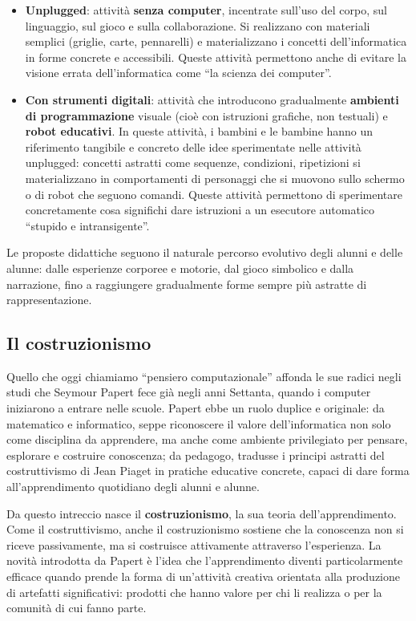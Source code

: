 \begin{itemize}
\item
  \textbf{Unplugged}: attività \textbf{senza computer}, incentrate sull'uso del corpo, sul linguaggio, sul gioco e sulla collaborazione. Si realizzano con materiali semplici (griglie, carte, pennarelli) e materializzano i concetti dell'informatica in forme concrete e accessibili. Queste attività permettono anche di evitare la visione errata dell'informatica come ``la scienza dei computer''.
\item
  \textbf{Con strumenti digitali}: attività che introducono gradualmente \textbf{ambienti di programmazione} visuale (cioè con istruzioni grafiche, non testuali) e \textbf{robot educativi}. In queste attività, i bambini e le bambine hanno un riferimento tangibile e concreto delle idee sperimentate nelle attività unplugged: concetti astratti come sequenze, condizioni, ripetizioni si materializzano in comportamenti di personaggi che si muovono sullo schermo o di robot che seguono comandi. Queste attività permettono di sperimentare concretamente cosa significhi dare istruzioni a un esecutore automatico ``stupido e intransigente''.
\end{itemize}

Le proposte didattiche seguono il naturale percorso evolutivo degli alunni e delle alunne: dalle esperienze corporee e motorie, dal gioco simbolico e dalla narrazione, fino a raggiungere gradualmente forme sempre più astratte di rappresentazione.

\subsection{Il costruzionismo }\label{il-costruzionismo}

Quello che oggi chiamiamo ``pensiero computazionale'' affonda le sue radici negli studi che Seymour Papert fece già negli anni Settanta, quando i computer iniziarono a entrare nelle scuole. Papert ebbe un ruolo duplice e originale: da matematico e informatico, seppe riconoscere il valore dell'informatica non solo come disciplina da apprendere, ma anche come ambiente privilegiato per pensare, esplorare e costruire conoscenza; da pedagogo, tradusse i principi astratti del costruttivismo di Jean Piaget in pratiche educative concrete, capaci di dare forma all'apprendimento quotidiano degli alunni e alunne.

Da questo intreccio nasce il \textbf{costruzionismo}, la sua teoria dell'apprendimento. Come il costruttivismo, anche il costruzionismo sostiene che la conoscenza non si riceve passivamente, ma si costruisce attivamente attraverso l'esperienza. La novità introdotta da Papert è l'idea che l'apprendimento diventi particolarmente efficace quando prende la forma di un'attività creativa orientata alla produzione di artefatti significativi: prodotti che hanno valore per chi li realizza o per la comunità di cui fanno parte.

